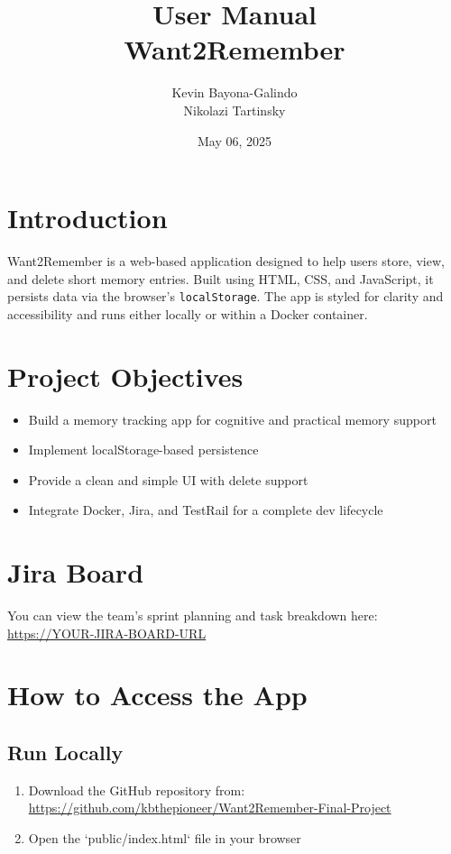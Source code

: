 \documentclass[12pt]{article}
\title{\Huge User Manual\\[0.5em]\LARGE Want2Remember}
\author{Kevin Bayona-Galindo \\ Nikolazi Tartinsky}
\date{May 06, 2025}
\begin{document}
\maketitle
\tableofcontents
\newpage

\section{Introduction}
Want2Remember is a web-based application designed to help users store, view, and delete short memory entries. Built using HTML, CSS, and JavaScript, it persists data via the browser’s \texttt{localStorage}. The app is styled for clarity and accessibility and runs either locally or within a Docker container.

\section{Project Objectives}
\begin{itemize}
  \item Build a memory tracking app for cognitive and practical memory support
  \item Implement localStorage-based persistence
  \item Provide a clean and simple UI with delete support
  \item Integrate Docker, Jira, and TestRail for a complete dev lifecycle
\end{itemize}

\section{Jira Board}
You can view the team's sprint planning and task breakdown here:  
\url{https://YOUR-JIRA-BOARD-URL}

\section{How to Access the App}
\subsection*{Run Locally}
\begin{enumerate}
  \item Download the GitHub repository from:  
  \url{https://github.com/kbthepioneer/Want2Remember-Final-Project}
  \item Open the `public/index.html` file in your browser
\end{enumerate}
\end{document}
